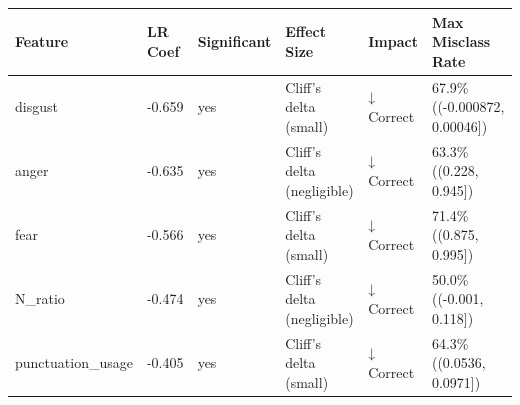 \begin{tabular}{llllll}
\toprule
Feature & LR Coef & Significant & Effect Size & Impact & Max Misclass Rate \\
\midrule
disgust & -0.659 & yes & Cliff's delta (small) & ↓ Correct & 67.9\% ((-0.000872, 0.00046]) \\
anger & -0.635 & yes & Cliff's delta (negligible) & ↓ Correct & 63.3\% ((0.228, 0.945]) \\
fear & -0.566 & yes & Cliff's delta (small) & ↓ Correct & 71.4\% ((0.875, 0.995]) \\
N\_ratio & -0.474 & yes & Cliff's delta (negligible) & ↓ Correct & 50.0\% ((-0.001, 0.118]) \\
punctuation\_usage & -0.405 & yes & Cliff's delta (small) & ↓ Correct & 64.3\% ((0.0536, 0.0971]) \\
\bottomrule
\end{tabular}
